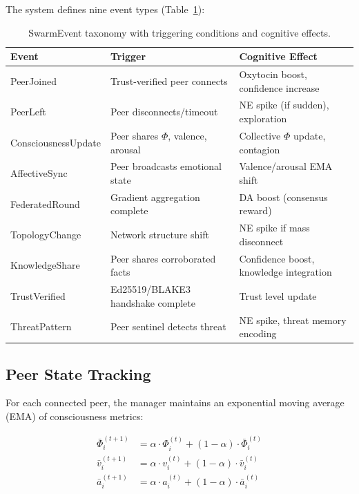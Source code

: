 \documentclass[11pt,a4paper]{article}
\begin{document}
The system defines nine event types (Table~\ref{tab:events}):

\begin{table}[h]
\centering
\caption{SwarmEvent taxonomy with triggering conditions and cognitive effects.}
\label{tab:events}
\begin{tabular}{p{3.2cm}p{4cm}p{5cm}}
\toprule
\textbf{Event} & \textbf{Trigger} & \textbf{Cognitive Effect} \\
\midrule
PeerJoined & Trust-verified peer connects & Oxytocin boost, confidence increase \\
PeerLeft & Peer disconnects/timeout & NE spike (if sudden), exploration \\
ConsciousnessUpdate & Peer shares $\Phi$, valence, arousal & Collective $\Phi$ update, contagion \\
AffectiveSync & Peer broadcasts emotional state & Valence/arousal EMA shift \\
FederatedRound & Gradient aggregation complete & DA boost (consensus reward) \\
TopologyChange & Network structure shift & NE spike if mass disconnect \\
KnowledgeShare & Peer shares corroborated facts & Confidence boost, knowledge integration \\
TrustVerified & Ed25519/BLAKE3 handshake complete & Trust level update \\
ThreatPattern & Peer sentinel detects threat & NE spike, threat memory encoding \\
\bottomrule
\end{tabular}
\end{table}

\subsection{Peer State Tracking}

For each connected peer, the manager maintains an exponential moving average (EMA) of consciousness metrics:

\begin{align}
\bar{\Phi}_i^{(t+1)} &= \alpha \cdot \Phi_i^{(t)} + (1 - \alpha) \cdot \bar{\Phi}_i^{(t)} \\
\bar{v}_i^{(t+1)} &= \alpha \cdot v_i^{(t)} + (1 - \alpha) \cdot \bar{v}_i^{(t)} \\
\bar{a}_i^{(t+1)} &= \alpha \cdot a_i^{(t)} + (1 - \alpha) \cdot \bar{a}_i^{(t)}
\end{align}
\end{document}
